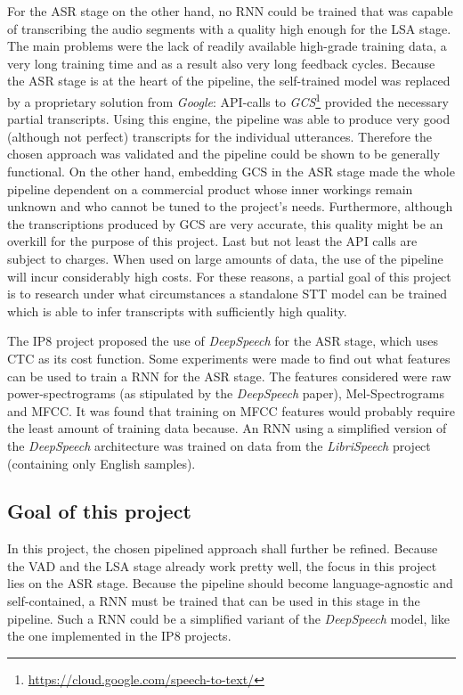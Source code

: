 For the \ac{ASR} stage on the other hand, no \ac{RNN} could be trained that was capable of transcribing the audio segments with a quality high enough for the \ac{LSA} stage. The main problems were the lack of readily available high-grade training data, a very long training time and as a result also very long feedback cycles. Because the \ac{ASR} stage is at the heart of the pipeline, the self-trained model was replaced by a proprietary solution from \textit{Google}: API-calls to \textit{\ac{GCS}}\footnote{\url{https://cloud.google.com/speech-to-text/}} provided the necessary partial transcripts. Using this engine, the pipeline was able to produce very good (although not perfect) transcripts for the individual utterances. Therefore the chosen approach was validated and the pipeline could be shown to be generally functional. On the other hand, embedding \ac{GCS} in the \ac{ASR} stage made the whole pipeline dependent on a commercial product whose inner workings remain unknown and who cannot be tuned to the project's needs. Furthermore, although the transcriptions produced by \ac{GCS} are very accurate, this quality might be an overkill for the purpose of this project. Last but not least the API calls are subject to charges. When used on large amounts of data, the use of the pipeline will incur considerably high costs. For these reasons, a partial goal of this project is to research under what circumstances a standalone \ac{STT} model can be trained which is able to infer transcripts with sufficiently high quality.

The IP8 project proposed the use of \textit{DeepSpeech} for the \ac{ASR} stage, which uses \ac{CTC} \parencite{ctc_paper} as its cost function. Some experiments were made to find out what features can be used to train a \ac{RNN} for the \ac{ASR} stage. The features considered were raw power-spectrograms (as stipulated by the \textit{DeepSpeech} paper), Mel-Spectrograms and \ac{MFCC}. It was found that training on \ac{MFCC} features would probably require the least amount of training data because. An \ac{RNN} using a simplified version of the \textit{DeepSpeech} architecture was trained on data from the \textit{LibriSpeech} project (containing only English samples).

\subsection{Goal of this project}

In this project, the chosen pipelined approach shall further be refined. Because the \ac{VAD} and the \ac{LSA} stage already work pretty well, the focus in this project lies on the \ac{ASR} stage. Because the pipeline should become language-agnostic and self-contained, a \ac{RNN} must be trained that can be used in this stage in the pipeline. Such a \ac{RNN} could be a simplified variant of the \textit{DeepSpeech} model, like the one implemented in the IP8 projects. 

